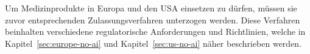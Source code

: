 Um Medizinprodukte in Europa und den USA einsetzen zu dürfen,
müssen sie zuvor entsprechenden Zulassungsverfahren unterzogen werden.
Diese Verfahren beinhalten verschiedene regulatorische Anforderungen und Richtlinien,
welche in Kapitel~\ref{sec:europe-no-ai} und Kapitel~\ref{sec:us-no-ai} näher beschrieben werden. 